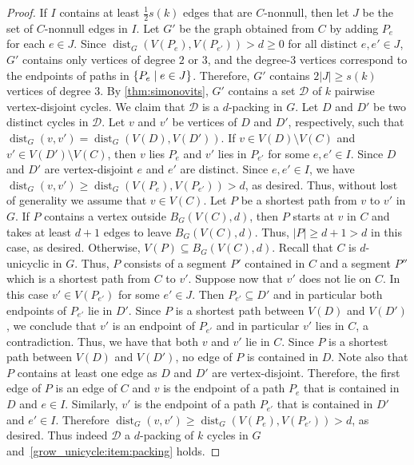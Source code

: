 \documentclass{patmorin}
\DeclareMathOperator{\dist}{dist}
\DeclarePairedDelimiter\set{\{}{\}}
\begin{document}
\begin{proof}
  If $I$ contains at least $\frac{1}{2}s(k)$ edges that are $C$-nonnull, then let $J$ be the set of $C$-nonnull edges in $I$.
  Let $G'$ be the graph obtained from $C$ by adding $P_e$ for each $e\in J$.
  Since $\dist_G(V(P_e),V(P_{e'}))>d\ge0$ for all distinct $e,e'\in J$, $G'$ contains only vertices of degree $2$ or $3$, and the degree-$3$ vertices correspond to the endpoints of paths in $\set{P_e \mid e\in J}$.
  Therefore, $G'$ contains $2|J|\geq s(k)$ vertices of degree $3$.
  By \cref{thm:simonovits}, $G'$ contains a set $\mathcal{D}$ of $k$ pairwise vertex-disjoint cycles.
  We claim that $\mathcal{D}$ is a $d$-packing in $G$.
  Let $D$ and $D'$ be two distinct cycles in $\mathcal{D}$.
  Let $v$ and $v'$ be vertices of $D$ and $D'$, respectively,
  such that $\dist_G(v,v')=\dist_G(V(D),V(D'))$.
  If $v\in V(D)\setminus V(C)$ and $v'\in V(D')\setminus V(C)$, then
  $v$ lies $P_e$ and $v'$ lies in $P_{e'}$ for some  $e,e' \in I$.
  Since $D$ and $D'$ are vertex-disjoint $e$ and $e'$ are distinct.
  Since $e,e'\in I$, we have $\dist_G(v,v') \geq \dist_G(V(P_e),V(P_{e'}))>d$, as desired.
  Thus, without lost of generality we assume that $v \in V(C)$.
  Let $P$ be a shortest path from $v$ to $v'$ in $G$.
  If $P$ contains a vertex outside $B_G(V(C),d)$, then
  $P$ starts at $v$ in $C$ and takes at least $d+1$ edges to leave $B_G(V(C),d)$. %
  Thus, $|P|\geq d+1 > d$ in this case, as desired.
  Otherwise, $V(P)\subseteq B_G(V(C),d)$. 
  Recall that $C$ is $d$-unicyclic in $G$.
  Thus, $P$ consists of a segment $P'$ contained in $C$ and a segment $P''$ which is a shortest path from $C$ to $v'$.
  Suppose now that $v'$ does not lie on $C$.
  In this case $v' \in V(P_{e'})$ for some $e'\in J$.
  Then $P_{e'}\subseteq D'$ and in particular both endpoints of $P_{e'}$ lie in $D'$.
  Since $P$ is a shortest path between $V(D)$ and $V(D')$,
  we conclude that $v'$ is an endpoint of $P_{e'}$ and in particular $v'$ lies in $C$, a contradiction.
  Thus, we have that both $v$ and $v'$ lie in $C$.
  Since $P$ is a shortest path between $V(D)$ and $V(D')$, no edge of $P$ is contained in $D$. Note also that $P$ contains at least one edge as $D$ and $D'$ are vertex-disjoint. Therefore, the first edge of $P$ is an edge of $C$ and $v$ is the endpoint of a path $P_e$ that is contained in $D$ and $e\in I$. Similarly, $v'$ is the endpoint of a path $P_{e'}$ that is contained in $D'$ and $e'\in I$. Therefore $\dist_G(v,v')\ge \dist_G(V(P_e),V(P_{e'}))>d$, as desired.
  Thus indeed $\mathcal{D}$ a $d$-packing of  $k$ cycles in $G$ and~\eqref{grow_unicycle:item:packing} holds.


\end{proof}
\end{document}
